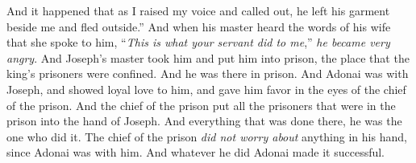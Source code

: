 \begin{biblechapter}
\verse And it happened that as I raised my voice and called out, he left his garment beside me and fled outside.”
\verse And when his master heard the words of his wife that she spoke to him, “\textit{This is what your servant did to me},” \textit{he became very angry}.
\verse And Joseph’s master took him and put him into prison, the place that the king’s prisoners were confined. And he was there in prison.
\verse And Adonai was with Joseph, and showed loyal love to him, and gave him favor in the eyes of the chief of the prison.
\verse And the chief of the prison put all the prisoners that were in the prison into the hand of Joseph. And everything that was done there, he was the one who did it.
\verse The chief of the prison \textit{did not worry about} anything in his hand, since Adonai was with him. And whatever he did Adonai made it successful.
\end{biblechapter}

